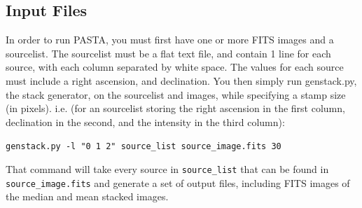 \documentclass{article}
\begin{document}
\subsection{Input Files}
In order to run PASTA, you must first have one or more FITS images and a sourcelist. The sourcelist must be a flat text file, and contain 1 line for each source,
with each column separated by white space. The values for each source must 
include a right ascension, and declination.  You then simply run genstack.py, 
 the stack generator, on the sourcelist and images, while 
specifying a stamp size (in pixels). i.e. (for an sourcelist storing the right
ascension in the first column, declination in the second, and the intensity in
the third column):
\begin{center}
\verb!genstack.py -l "0 1 2" source_list source_image.fits 30!
\end{center}
That command will take every source in \verb!source_list! that can be found in 
\verb!source_image.fits! and generate a set of output files, including FITS
images of the median and mean stacked images.
\end{document}
